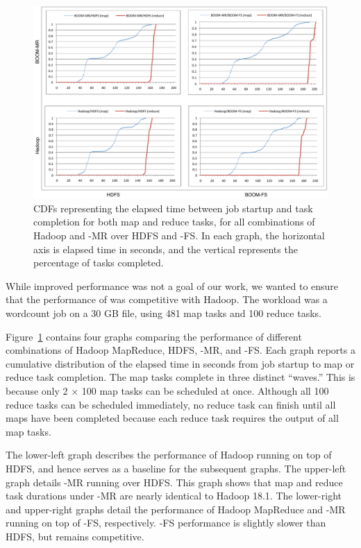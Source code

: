 \begin{figure}
\ssp
\centering
	\includegraphics[scale=0.75]{figures/fourgraphs}
\caption{CDFs representing the elapsed time between job startup and task
  completion for both map and reduce tasks, for all combinations of Hadoop and \BOOM-MR
  over HDFS and \BOOM-FS\@.  In each graph, the horizontal axis is
  elapsed time in seconds, and the vertical represents the percentage of tasks completed.}
\label{fig:ec2experiment}
\end{figure}

While improved performance was not a goal of our work, we wanted to
ensure that the performance of \BOOMA was competitive with Hadoop.
The workload was a wordcount job on a 30 GB file, using 481 map tasks 
and 100 reduce tasks.

Figure~\ref{fig:ec2experiment} contains four graphs comparing the performance of
different combinations of Hadoop MapReduce, HDFS, \BOOM-MR, and \BOOM-FS\@. Each
graph reports a cumulative distribution of the elapsed time in seconds from job
startup to map or reduce task completion. The map tasks complete in three
distinct ``waves.'' This is because only 2 $\times$ 100 map tasks can be
scheduled at once. Although all 100 reduce tasks can be scheduled immediately,
no reduce task can finish until all maps have been completed because each reduce
task requires the output of all map tasks.

The lower-left graph describes the performance of Hadoop running on top of HDFS,
and hence serves as a baseline for the subsequent graphs. The upper-left graph
details \BOOM-MR running over HDFS\@. This graph shows that map and reduce task
durations under \BOOM-MR are nearly identical to Hadoop 18.1. The lower-right
and upper-right graphs detail the performance of Hadoop MapReduce and \BOOM-MR
running on top of \BOOM-FS, respectively. \BOOM-FS performance is slightly
slower than HDFS, but remains competitive.


